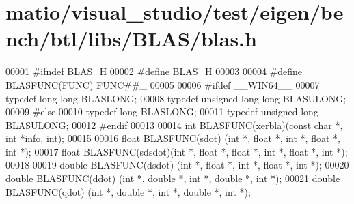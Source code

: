 \hypertarget{matio_2visual__studio_2test_2eigen_2bench_2btl_2libs_2_b_l_a_s_2blas_8h_source}{}\section{matio/visual\+\_\+studio/test/eigen/bench/btl/libs/\+B\+L\+A\+S/blas.h}
\label{matio_2visual__studio_2test_2eigen_2bench_2btl_2libs_2_b_l_a_s_2blas_8h_source}

\begin{DoxyCode}
00001 \textcolor{preprocessor}{#ifndef BLAS\_H}
00002 \textcolor{preprocessor}{#define BLAS\_H}
00003 
00004 \textcolor{preprocessor}{#define BLASFUNC(FUNC) FUNC##\_}
00005 
00006 \textcolor{preprocessor}{#ifdef \_\_WIN64\_\_}
00007 \textcolor{keyword}{typedef} \textcolor{keywordtype}{long} \textcolor{keywordtype}{long} BLASLONG;
00008 \textcolor{keyword}{typedef} \textcolor{keywordtype}{unsigned} \textcolor{keywordtype}{long} \textcolor{keywordtype}{long} BLASULONG;
00009 \textcolor{preprocessor}{#else}
00010 \textcolor{keyword}{typedef} \textcolor{keywordtype}{long} BLASLONG;
00011 \textcolor{keyword}{typedef} \textcolor{keywordtype}{unsigned} \textcolor{keywordtype}{long} BLASULONG;
00012 \textcolor{preprocessor}{#endif}
00013 
00014 \textcolor{keywordtype}{int}    BLASFUNC(xerbla)(\textcolor{keyword}{const} \textcolor{keywordtype}{char} *, \textcolor{keywordtype}{int} *info, int);
00015 
00016 \textcolor{keywordtype}{float}  BLASFUNC(sdot)  (\textcolor{keywordtype}{int} *, \textcolor{keywordtype}{float}  *, \textcolor{keywordtype}{int} *, \textcolor{keywordtype}{float}  *, \textcolor{keywordtype}{int} *);
00017 \textcolor{keywordtype}{float}  BLASFUNC(sdsdot)(\textcolor{keywordtype}{int} *, \textcolor{keywordtype}{float}  *,        \textcolor{keywordtype}{float}  *, \textcolor{keywordtype}{int} *, \textcolor{keywordtype}{float}  *, \textcolor{keywordtype}{int} *);
00018 
00019 \textcolor{keywordtype}{double} BLASFUNC(dsdot) (\textcolor{keywordtype}{int} *, \textcolor{keywordtype}{float}  *, \textcolor{keywordtype}{int} *, \textcolor{keywordtype}{float}  *, \textcolor{keywordtype}{int} *);
00020 \textcolor{keywordtype}{double} BLASFUNC(ddot)  (\textcolor{keywordtype}{int} *, \textcolor{keywordtype}{double} *, \textcolor{keywordtype}{int} *, \textcolor{keywordtype}{double} *, \textcolor{keywordtype}{int} *);
00021 \textcolor{keywordtype}{double} BLASFUNC(qdot)  (\textcolor{keywordtype}{int} *, \textcolor{keywordtype}{double} *, \textcolor{keywordtype}{int} *, \textcolor{keywordtype}{double} *, \textcolor{keywordtype}{int} *);

\end{DoxyCode}
